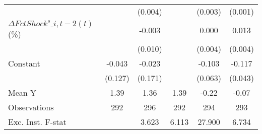 {\begin{tabular}{l*{5}{c}}
                    &                     &     (0.004)         &                     &     (0.003)         &     (0.001)         \\
\addlinespace
$ \Delta FctShock^s\_{i,t-2}(t)$ (\%)&                     &      -0.003         &                     &       0.000         &       0.013\sym{***}\\
                    &                     &     (0.010)         &                     &     (0.004)         &     (0.004)         \\
\addlinespace
Constant            &      -0.043         &      -0.023         &                     &      -0.103         &      -0.117\sym{**} \\
                    &     (0.127)         &     (0.171)         &                     &     (0.063)         &     (0.043)         \\
\midrule
Mean Y              &        1.39         &        1.36         &        1.39         &       -0.22         &       -0.07         \\
Observations        &         292         &         296         &         292         &         294         &         293         \\
Exc. Inst. F-stat   &                     &       3.623         &       6.113         &      27.900         &       6.734         \\
\bottomrule
\end{tabular}
}
